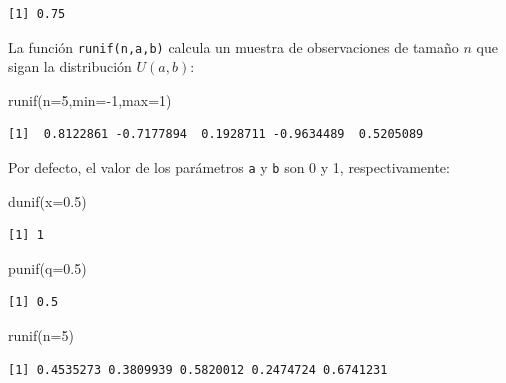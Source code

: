 \documentclass[
  letterpaper,
  DIV=11,
  numbers=noendperiod]{scrreprt}
\newenvironment{Shaded}{\begin{snugshade}}{\end{snugshade}}
\newcommand{\AttributeTok}[1]{\textcolor[rgb]{0.40,0.45,0.13}{#1}}
\newcommand{\DecValTok}[1]{\textcolor[rgb]{0.68,0.00,0.00}{#1}}
\newcommand{\FloatTok}[1]{\textcolor[rgb]{0.68,0.00,0.00}{#1}}
\newcommand{\FunctionTok}[1]{\textcolor[rgb]{0.28,0.35,0.67}{#1}}
\newcommand{\NormalTok}[1]{\textcolor[rgb]{0.00,0.23,0.31}{#1}}
\newcommand{\SpecialCharTok}[1]{\textcolor[rgb]{0.37,0.37,0.37}{#1}}
\begin{document}
\begin{verbatim}
[1] 0.75
\end{verbatim}

La función \texttt{runif(n,a,b)} calcula un muestra de observaciones de
tamaño \(n\) que sigan la distribución \(U(a,b)\):

\begin{Shaded}
\begin{Highlighting}[]
\FunctionTok{runif}\NormalTok{(}\AttributeTok{n=}\DecValTok{5}\NormalTok{,}\AttributeTok{min=}\SpecialCharTok{{-}}\DecValTok{1}\NormalTok{,}\AttributeTok{max=}\DecValTok{1}\NormalTok{)}
\end{Highlighting}
\end{Shaded}

\begin{verbatim}
[1]  0.8122861 -0.7177894  0.1928711 -0.9634489  0.5205089
\end{verbatim}

Por defecto, el valor de los parámetros \texttt{a} y \texttt{b} son 0 y
1, respectivamente:

\begin{Shaded}
\begin{Highlighting}[]
\FunctionTok{dunif}\NormalTok{(}\AttributeTok{x=}\FloatTok{0.5}\NormalTok{)}
\end{Highlighting}
\end{Shaded}

\begin{verbatim}
[1] 1
\end{verbatim}

\begin{Shaded}
\begin{Highlighting}[]
\FunctionTok{punif}\NormalTok{(}\AttributeTok{q=}\FloatTok{0.5}\NormalTok{)}
\end{Highlighting}
\end{Shaded}

\begin{verbatim}
[1] 0.5
\end{verbatim}

\begin{Shaded}
\begin{Highlighting}[]
\FunctionTok{runif}\NormalTok{(}\AttributeTok{n=}\DecValTok{5}\NormalTok{)}
\end{Highlighting}
\end{Shaded}

\begin{verbatim}
[1] 0.4535273 0.3809939 0.5820012 0.2474724 0.6741231
\end{verbatim}
\end{document}
